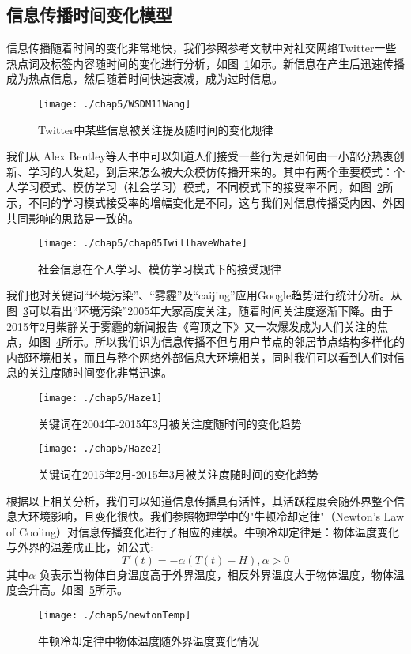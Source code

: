\subsection{信息传播时间变化模型}
信息传播随着时间的变化非常地快，我们参照参考文献\cite{yang2011patterns}中对社交网络Twitter一些热点词及标签内容随时间的变化进行分析，如图~\ref{fig:chap05WSDM11Wang}如示。新信息在产生后迅速传播成为热点信息，然后随着时间快速衰减，成为过时信息。
\begin{figure}[H] 
	\centering
	\texttt{[image: ./chap5/WSDM11Wang]}
	\caption{Twitter中某些信息被关注提及随时间的变化规律}
	\label{fig:chap05WSDM11Wang}
\end{figure}
我们从 Alex Bentley等人\cite{bentley2011ll}书中可以知道人们接受一些行为是如何由一小部分热衷创新、学习的人发起，到后来怎么被大众模仿传播开来的。其中有两个重要模式：个人学习模式、模仿学习（社会学习）模式，不同模式下的接受率不同，如图~\ref{fig:chap05IwillhaveWhate}所示，不同的学习模式接受率的增幅变化是不同，这与我们对信息传播受内因、外因共同影响的思路是一致的。
\begin{figure}[H] 
	\centering
	\texttt{[image: ./chap5/chap05IwillhaveWhate]}
	\caption{社会信息在个人学习、模仿学习模式下的接受规律}
	\label{fig:chap05IwillhaveWhate}
\end{figure}
我们也对关键词“环境污染”、“雾霾”及“caijing”应用Google趋势进行统计分析。从图~\ref{fig:chap05Haze1}可以看出“环境污染”2005年大家高度关注，随着时间关注度逐渐下降。由于2015年2月柴静关于雾霾的新闻报告《穹顶之下》又一次爆发成为人们关注的焦点，如图~\ref{fig:chap05Haze2}所示。所以我们识为信息传播不但与用户节点的邻居节点结构多样化的内部环境相关，而且与整个网络外部信息大环境相关，同时我们可以看到人们对信息的关注度随时间变化非常迅速。
\begin{figure}[H] 
	\centering
	\texttt{[image: ./chap5/Haze1]}
	\caption{关键词在2004年-2015年3月被关注度随时间的变化趋势}
	\label{fig:chap05Haze1}
\end{figure}
\begin{figure}[H] 
	\centering
	\texttt{[image: ./chap5/Haze2]}
	\caption{关键词在2015年2月-2015年3月被关注度随时间的变化趋势}
	\label{fig:chap05Haze2}
\end{figure}

根据以上相关分析，我们可以知道信息传播具有活性，其活跃程度会随外界整个信息大环境影响，且变化很快。我们参照物理学中的"牛顿冷却定律"（Newton's Law of Cooling）\cite{winterton1999newton,incropera2011fundamentals}对信息传播变化进行了相应的建模。牛顿冷却定律是：物体温度变化与外界的温差成正比，如公式:
\begin{equation} 
\label{chap05newtoncool}
T'(t) = -\alpha (T(t)-H) ,\alpha > 0
\end{equation}
其中$\alpha$ 负表示当物体自身温度高于外界温度，相反外界温度大于物体温度，物体温度会升高。如图~\ref{fig:chap05newtonTemp}所示。
\begin{figure}[H] 
	\centering
	\texttt{[image: ./chap5/newtonTemp]}
	\caption{牛顿冷却定律中物体温度随外界温度变化情况}
	\label{fig:chap05newtonTemp}
\end{figure}


